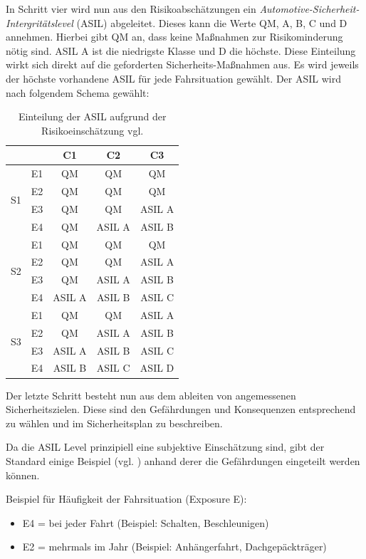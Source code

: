 \documentclass[a4paper,DIV=calc,ngerman]{scrartcl}
\begin{document}
In Schritt vier wird nun aus den Risikoabschätzungen ein \emph{Automotive-Sicherheit-Intergritätslevel} (ASIL) abgeleitet. Dieses kann die Werte QM, A, B, C und D annehmen. Hierbei gibt QM an, dass keine Maßnahmen zur Risikominderung nötig sind. ASIL A ist die niedrigste Klasse und D die höchste. Diese Einteilung wirkt sich direkt auf die geforderten Sicherheits-Maßnahmen aus. Es wird jeweils der höchste vorhandene ASIL für jede Fahrsituation gewählt. Der ASIL wird nach folgendem Schema gewählt:


\begin{table}[h]
\center
\begin{tabular}[h]{c c | c c c}
\toprule
 &  & C1 & C2 & C3\\
\midrule
\multirow{4}{*}{S1} & E1 & QM & QM & QM\\
 & E2 & QM & QM & QM\\
 & E3 & QM & QM & ASIL A\\
 & E4 & QM & ASIL A & ASIL B\\
\midrule
\multirow{4}{*}{S2} & E1 & QM & QM & QM\\
 & E2 & QM & QM & ASIL A\\
 & E3 & QM & ASIL A & ASIL B\\
 & E4 & ASIL A & ASIL B & ASIL C\\
\midrule
\multirow{4}{*}{S3} & E1 & QM & QM & ASIL A\\
 & E2 & QM & ASIL A & ASIL B\\
 & E3 & ASIL A & ASIL B & ASIL C\\
 & E4 & ASIL B & ASIL C & ASIL D\\
\bottomrule
\end{tabular}
\caption{Einteilung der ASIL aufgrund der Risikoeinschätzung vgl. \cite[S. 125]{1}}
\label{tab:asil}
\end{table}

Der letzte Schritt besteht nun aus dem ableiten von angemessenen Sicherheitszielen. Diese sind den Gefährdungen und Konsequenzen entsprechend zu wählen und im Sicherheitsplan zu beschreiben.

Da die ASIL Level prinzipiell eine subjektive Einschätzung sind, gibt der Standard einige Beispiel (vgl. \cite[S. 125]{1}) anhand derer die Gefährdungen eingeteilt werden können.

Beispiel für Häufigkeit der Fahrsituation (Exposure E):
\begin{itemize}
    \item E4 = bei jeder Fahrt (Beispiel: Schalten, Beschleunigen)
    \item E2 = mehrmals im Jahr (Beispiel: Anhängerfahrt, Dachgepäckträger)
\end{itemize}
\end{document}
